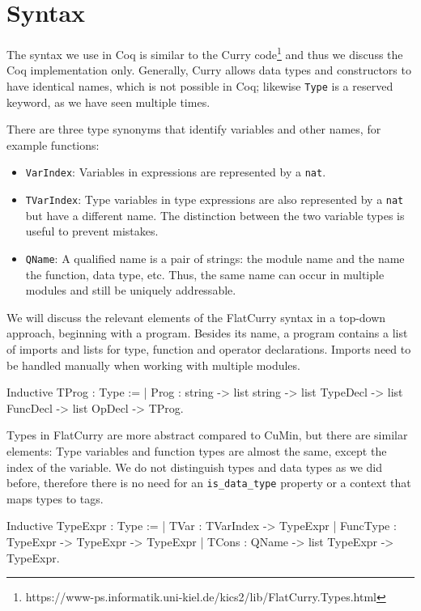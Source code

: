 \documentclass[fleqn, abstract=on]{scrreprt}
\newcommand{\todo}[1]{\marginpar{\textbf{TODO:} #1}}
\newcommand{\coqinline}[1]{\texttt{#1}}
\begin{document}
\section{Syntax}
\label{flatcurrysyntax}
The syntax we use in Coq is similar to the Curry code\footnote{https://www-ps.informatik.uni-kiel.de/kics2/lib/FlatCurry.Types.html} and thus we discuss the Coq implementation only. Generally, Curry allows data types and constructors to have identical names, which is not possible in Coq; likewise \texttt{Type} is a reserved keyword, as we have seen multiple times.
\par
There are three type synonyms that identify variables and other names, for example functions:
\begin{itemize}
	\item \coqinline{VarIndex}: Variables in expressions are represented by a \coqinline{nat}.
	\item \coqinline{TVarIndex}: Type variables in type expressions are also represented by a \coqinline{nat} but have a different name. The distinction between the two variable types is useful to prevent mistakes.
	\item \coqinline{QName}: A qualified name is a pair of strings: the module name and the name the function, data type, etc. Thus, the same name can occur in multiple modules and still be uniquely addressable.
\end{itemize}
We will discuss the relevant elements of the FlatCurry syntax in a top-down approach, beginning with a program. Besides its name, a program contains a list of imports and lists for type, function and operator declarations. Imports need to be handled manually when working with multiple modules. \todo{Verlinkung praktische Nutzung}
\begin{coqcode}
Inductive TProg : Type := 
| Prog : string -> list string ->
         list TypeDecl -> list FuncDecl -> list OpDecl -> TProg.
\end{coqcode}
Types in FlatCurry are more abstract compared to CuMin, but there are similar elements: Type variables and function types are almost the same, except the index of the variable. We do not distinguish types and data types as we did before, therefore there is no need for an \texttt{is\_data\_type} property or a context that maps types to tags.
\begin{coqcode}
Inductive TypeExpr : Type :=
  | TVar     : TVarIndex -> TypeExpr
  | FuncType : TypeExpr  -> TypeExpr      -> TypeExpr
  | TCons    : QName     -> list TypeExpr -> TypeExpr.
\end{coqcode}
\end{document}
